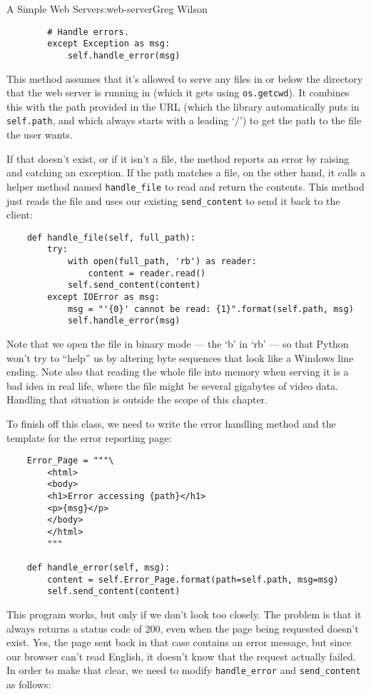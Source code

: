 \begin{aosachapter}{A Simple Web Server}{s:web-server}{Greg Wilson}
\begin{verbatim}
        # Handle errors.
        except Exception as msg:
            self.handle_error(msg)
\end{verbatim}

This method assumes that it's allowed to serve any files in or below the
directory that the web server is running in (which it gets using
\texttt{os.getcwd}). It combines this with the path provided in the URL
(which the library automatically puts in \texttt{self.path}, and which
always starts with a leading `/') to get the path to the file the user
wants.

If that doesn't exist, or if it isn't a file, the method reports an
error by raising and catching an exception. If the path matches a file,
on the other hand, it calls a helper method named \texttt{handle\_file}
to read and return the contents. This method just reads the file and
uses our existing \texttt{send\_content} to send it back to the client:

\begin{verbatim}
    def handle_file(self, full_path):
        try:
            with open(full_path, 'rb') as reader:
                content = reader.read()
            self.send_content(content)
        except IOError as msg:
            msg = "'{0}' cannot be read: {1}".format(self.path, msg)
            self.handle_error(msg)
\end{verbatim}

Note that we open the file in binary mode --- the `b' in `rb' --- so
that Python won't try to ``help'' us by altering byte sequences that
look like a Windows line ending. Note also that reading the whole file
into memory when serving it is a bad idea in real life, where the file
might be several gigabytes of video data. Handling that situation is
outside the scope of this chapter.

To finish off this class, we need to write the error handling method and
the template for the error reporting page:

\begin{verbatim}
    Error_Page = """\
        <html>
        <body>
        <h1>Error accessing {path}</h1>
        <p>{msg}</p>
        </body>
        </html>
        """

    def handle_error(self, msg):
        content = self.Error_Page.format(path=self.path, msg=msg)
        self.send_content(content)
\end{verbatim}

This program works, but only if we don't look too closely. The problem
is that it always returns a status code of 200, even when the page being
requested doesn't exist. Yes, the page sent back in that case contains
an error message, but since our browser can't read English, it doesn't
know that the request actually failed. In order to make that clear, we
need to modify \texttt{handle\_error} and \texttt{send\_content} as
follows:


\end{aosachapter}
